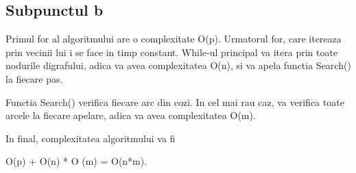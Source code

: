 \documentclass{article}
\begin{document}
\subsection*{\fontsize{16}{30}\selectfont Subpunctul b}
{\fontsize{14}{16}\selectfont
Primul for al algoritmului are o complexitate O(p). Urmatorul for, care itereaza prin vecinii lui i se face in timp constant. While-ul principal va itera prin toate nodurile digrafului, adica va avea complexitatea O(n), si va apela functia Search() la fiecare pas.

Functia Search() verifica fiecare arc din cozi. In cel mai rau caz, va verifica toate arcele la fiecare apelare, adica va avea complexitatea O(m).

In final, complexitatea algoritmului va fi  \\ \centerline {O(p) + O(n) * O (m) = O(n*m).}
}
\end{document}
